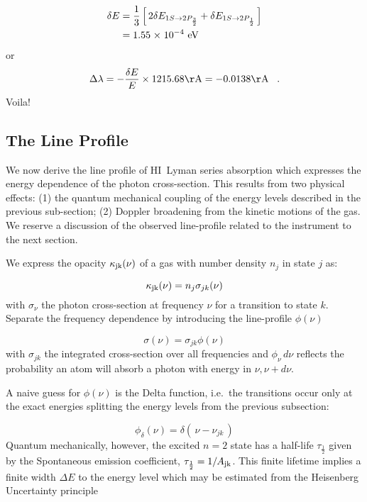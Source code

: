 \documentclass[graybox]{svmult}
\newcommand{\HI}{H{\sc I}}
\def\ohf{\frac{1}{2}}
\def\ltk{\left [ \,}
\def\ltp{\left ( \,}
\def\rtk{\, \right  ] }
\def\rtp{\, \right  ) }
\def\sci#1{{\; \times \; 10^{#1}}}
\def\rhf{\frac{3}{2}}
\def\perd{\;\;\; .}
\begin{document}
\begin{align}
\delta E &= \frac{1}{3} \ltk 2\delta E_{1S \to 2P_\rhf} + \delta E_{1S \to 2P_\ohf}
   \rtk \\
         &= 1.55 \sci{-4}~{\rm eV}
\end{align}
or
\begin{equation}
\Delta \lambda = -\frac{\delta E}{E} \times 1215.68 {\rm \AA} = -0.0138 {\rm \AA} \perd
\end{equation}
Voila!

\subsection{The Line Profile}

We now derive the line profile of \HI\ Lyman series absorption
which expresses the energy dependence of the
photon cross-section.   This results from two physical
effects: 
(1) the quantum mechanical coupling of the energy
levels described in the previous sub-section; 
(2) Doppler broadening from the kinetic motions of the gas.
We reserve a discussion of the observed
line-profile related to the instrument to the next section.

We express the opacity $\kappa_{\rm jk}(\nu)$
of a gas with number
density $n_j$ in state $j$ as:

\begin{equation} 
\kappa_{\rm jk}(\nu) = n_j \sigma_{jk}(\nu)
\end{equation} 
with $\sigma_\nu$ the photon cross-section 
at frequency $\nu$ for a transition to state $k$.
Separate the frequency dependence by introducing
the line-profile $\phi(\nu)$

\begin{equation}
\sigma(\nu) = \sigma_{jk} \phi(\nu)
\end{equation}
with $\sigma_{jk}$ the integrated cross-section over all frequencies
and $\phi_\nu \, d\nu$ reflects the probability an atom will absorb
a photon with energy in $\nu, \nu + d\nu$.

A naive guess for $\phi(\nu)$ is the Delta function,
i.e.\ the transitions occur only at the exact energies
splitting the energy levels from the previous subsection:

\begin{equation}
\phi_\delta(\nu) = \delta \ltp \nu - \nu_{jk} \rtp
\end{equation}
Quantum mechanically, however, the excited $n=2$
state has a half-life $\tau_\ohf$ 
given by the Spontaneous emission coefficient,
$\tau_\ohf = 1/A_{\rm jk}$.
This finite lifetime implies a finite width
$\Delta E$ to the energy level which may be estimated
from the Heisenberg Uncertainty principle
\end{document}
